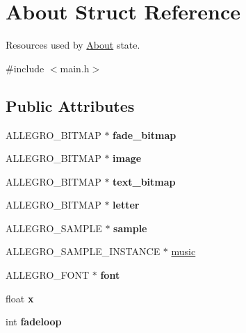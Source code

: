 \hypertarget{structAbout}{\section{\-About \-Struct \-Reference}
\label{structAbout}
}


\-Resources used by \hyperlink{structAbout}{\-About} state.  




{\ttfamily \#include $<$main.\-h$>$}

\subsection*{\-Public \-Attributes}
\begin{DoxyCompactItemize}
\item 
\hypertarget{structAbout_a0c80b08e1d60093504bed342b41e51c1}{\-A\-L\-L\-E\-G\-R\-O\-\_\-\-B\-I\-T\-M\-A\-P $\ast$ {\bfseries fade\-\_\-bitmap}}\label{structAbout_a0c80b08e1d60093504bed342b41e51c1}

\item 
\hypertarget{structAbout_a9e724aa84d322d2bfff5c00109492a1d}{\-A\-L\-L\-E\-G\-R\-O\-\_\-\-B\-I\-T\-M\-A\-P $\ast$ {\bfseries image}}\label{structAbout_a9e724aa84d322d2bfff5c00109492a1d}

\item 
\hypertarget{structAbout_a2e5dbd59393791949fd988de7b770f86}{\-A\-L\-L\-E\-G\-R\-O\-\_\-\-B\-I\-T\-M\-A\-P $\ast$ {\bfseries text\-\_\-bitmap}}\label{structAbout_a2e5dbd59393791949fd988de7b770f86}

\item 
\hypertarget{structAbout_aa46380e60629ac39d782e18dc6a08f8e}{\-A\-L\-L\-E\-G\-R\-O\-\_\-\-B\-I\-T\-M\-A\-P $\ast$ {\bfseries letter}}\label{structAbout_aa46380e60629ac39d782e18dc6a08f8e}

\item 
\hypertarget{structAbout_aaae3fb8b349d9973fde2156e1f86c75b}{\-A\-L\-L\-E\-G\-R\-O\-\_\-\-S\-A\-M\-P\-L\-E $\ast$ {\bfseries sample}}\label{structAbout_aaae3fb8b349d9973fde2156e1f86c75b}

\item 
\-A\-L\-L\-E\-G\-R\-O\-\_\-\-S\-A\-M\-P\-L\-E\-\_\-\-I\-N\-S\-T\-A\-N\-C\-E $\ast$ \hyperlink{structAbout_a4c25f6cd85f909dca5325b8825eed16c}{music}
\item 
\hypertarget{structAbout_ad14358b4942c0260e502a65b98732f93}{\-A\-L\-L\-E\-G\-R\-O\-\_\-\-F\-O\-N\-T $\ast$ {\bfseries font}}\label{structAbout_ad14358b4942c0260e502a65b98732f93}

\item 
\hypertarget{structAbout_a8ff1ed42ee1abd6ad45def77614015ce}{float {\bfseries x}}\label{structAbout_a8ff1ed42ee1abd6ad45def77614015ce}

\item 
\hypertarget{structAbout_a3a7b7ae29163ae843671a2c2b5e8c1f0}{int {\bfseries fadeloop}}\label{structAbout_a3a7b7ae29163ae843671a2c2b5e8c1f0}

\end{DoxyCompactItemize}


